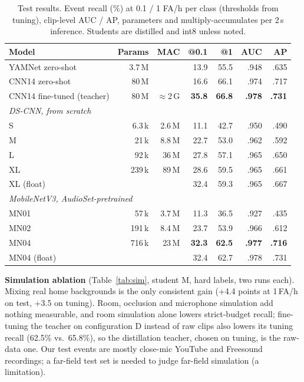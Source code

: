 \documentclass[conference]{IEEEtran}
\begin{document}
\begin{table}[t]\centering\caption{Test results. Event recall (\%) at 0.1 / 1 FA/h per class
(thresholds from tuning), clip-level AUC / AP, parameters and multiply-accumulates per 2\,s
inference. Students are distilled and int8 unless noted.}\label{tab:main}
\setlength{\tabcolsep}{2.6pt}
\begin{tabular}{lrrrrrr}\toprule
Model & Params & MAC & @0.1 & @1 & AUC & AP \\ \midrule
YAMNet zero-shot & 3.7\,M & & 13.9 & 55.5 & .948 & .635 \\
CNN14 zero-shot & 80\,M & & 16.6 & 66.1 & .974 & .717 \\
CNN14 fine-tuned (teacher) & 80\,M & $\approx$2\,G & \textbf{35.8} & \textbf{66.8} & \textbf{.978} & \textbf{.731} \\ \midrule
\multicolumn{7}{l}{\emph{DS-CNN, from scratch}} \\
S & 6.3\,k & 2.6\,M & 11.1 & 42.7 & .950 & .490 \\
M & 21\,k & 8.8\,M & 22.7 & 53.0 & .962 & .592 \\
L & 92\,k & 36\,M & 27.8 & 57.1 & .965 & .650 \\
XL & 239\,k & 89\,M & 28.6 & 59.5 & .965 & .661 \\
XL (float) & & & 32.4 & 59.3 & .965 & .667 \\ \midrule
\multicolumn{7}{l}{\emph{MobileNetV3, AudioSet-pretrained}} \\
MN01 & 57\,k & 3.7\,M & 11.3 & 36.5 & .927 & .435 \\
MN02 & 191\,k & 8.4\,M & 23.7 & 53.9 & .966 & .612 \\
MN04 & 716\,k & 23\,M & \textbf{32.3} & \textbf{62.5} & \textbf{.977} & \textbf{.716} \\
MN04 (float) & & & 32.4 & 62.7 & .978 & .731 \\ \bottomrule
\end{tabular}\end{table}

\textbf{Simulation ablation} (Table~\ref{tab:sim}, student M, hard labels, two runs each).
Mixing real home backgrounds is the only consistent gain (+4.4 points at 1\,FA/h on test, +3.5
on tuning). Room, occlusion and microphone simulation add nothing measurable, and room simulation
alone lowers strict-budget recall; fine-tuning the teacher on configuration D instead of raw
clips also lowers its tuning recall (62.5\% vs.\ 65.8\%), so the distillation teacher, chosen on
tuning, is the raw-data one. Our test events are mostly close-mic YouTube and Freesound
recordings; a far-field test set is needed to judge far-field simulation (a limitation).
\end{document}
